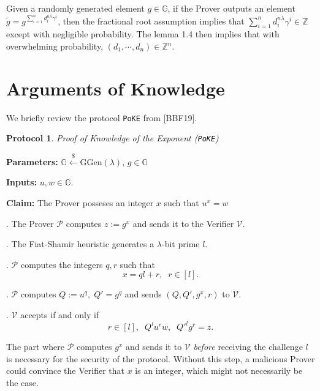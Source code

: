 \documentclass[11pt, lettersize, notitlepage, leqno, footskip=0.6cm]{article}
\newcommand{\bz}{\mathbb Z}
\newcommand{\wti}{\widetilde}
\newcommand{\mc}{\mathcal}
\newcommand{\mb}{\mathbb}
\newcommand{\mr}{\mathrm}
\newcommand{\lam}{\lambda}
\newcommand{\lamb}{\lambda}
\newcommand{\op}{overwhelming probability}
\newtheorem{Prot}[Thm]{Protocol}
\numberwithin{equation}{section}
\begin{document}
Given a randomly generated element $g\in \mb{G}$, if the Prover outputs an element $\wti{g} = g^{\sum\limits_{i=1}^n d_i^{n\lam}\gamma^i}$, then the fractional root assumption implies that $\sum\limits_{i=1}^n d_i^{n\lam}\gamma^i\in \bz$ except with negligible probability. The lemma 1.4 then implies that with \op, $(d_1,\cdots,d_n)\in \bz^n$.
\bigskip



\section{\fontsize{12}{12}\selectfont Arguments of Knowledge  }

\noindent We briefly review the protocol \verb|PoKE| from [BBF19]. 

\begin{Prot} \normalfont \textit{Proof of Knowledge of the Exponent} (\verb|PoKE|) \end{Prot} \vspace{-0.3cm}

\noindent \textbf{Parameters:} $\mb{G}\xleftarrow{\$} \mr{GGen}(\lamb)$,\; $g\in \mb{G}$

\noindent \textbf{Inputs:} $u, w \in \mb{G}$.

\noindent \textbf{Claim:} The Prover posseses an integer $x$ such that $u^x = w$

\begin{prf1} . The Prover $\mc{P}$ computes $z:= g^x$ and sends it to the Verifier $\mc{V}$.

. The Fiat-Shamir heuristic generates a $\lamb$-bit prime $l$.

. $\mc{P}$ computes the integers $q, r$ such that  \vspace{-0.15cm}$$x = ql+r,\;\; r\in [l].$$

. $\mc{P}$ computes $Q:= u^q,\; Q' = g^q$ and sends $(Q, Q', g^x, r)$ to $\mc{V}$.

. $\mc{V}$ accepts if and only if \vspace{-0.15cm}$$r\in [l],\;\; Q^lu^r w,\;\; Q'^lg^r = z.$$\end{prf1}

The part where $\mc{P}$ computes $g^x$ and sends it to $\mc{V}$ \textit{before} receiving the challenge $l$ is necessary for the security of the protocol. Without this step, a malicious Prover could convince the Verifier that $x$ is an integer, which might not necessarily be the case.
\end{document}
